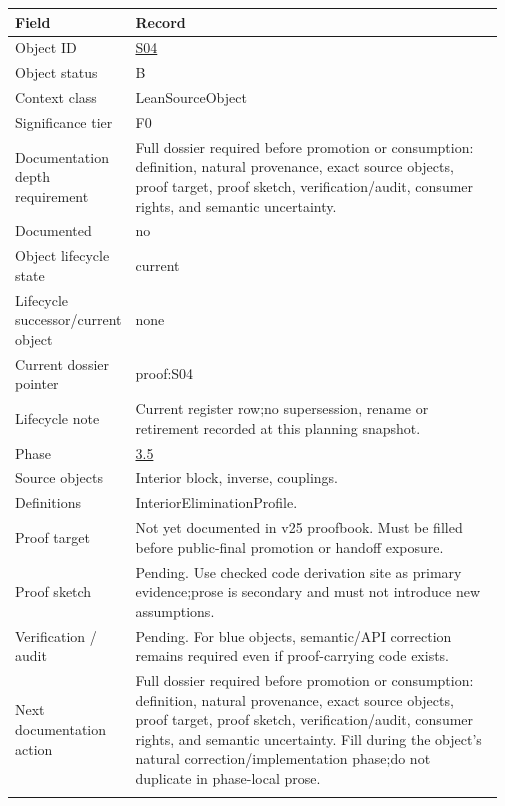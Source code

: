 \begin{longtable}{L{0.16\linewidth} L{0.81\linewidth}}
\hline
\textbf{Field} & \textbf{Record}\\
\hline
Object ID & \hyperlink{object-row-S04}{S04}\\
\hline\addlinespace[0.20em]
Object status & B\\
\hline\addlinespace[0.20em]
Context class & LeanSourceObject\\
\hline\addlinespace[0.20em]
Significance tier & F0\\
\hline\addlinespace[0.20em]
Documentation depth requirement & Full dossier required before promotion or consumption: definition, natural provenance, exact source objects, proof target, proof sketch, verification/\allowbreak{}audit, consumer rights, and semantic uncertainty.\\
\hline\addlinespace[0.20em]
Documented & no\\
\hline\addlinespace[0.20em]
Object lifecycle state & current\\
\hline\addlinespace[0.20em]
Lifecycle successor/\allowbreak{}current object & none\\
\hline\addlinespace[0.20em]
Current dossier pointer & proof:S04\\
\hline\addlinespace[0.20em]
Lifecycle note & Current register row;\newline no supersession, rename or retirement recorded at this planning snapshot.\\
\hline\addlinespace[0.20em]
Phase & \hyperlink{phase-row-3-5}{3.5}\\
\hline\addlinespace[0.20em]
Source objects & Interior block, inverse, couplings.\\
\hline\addlinespace[0.20em]
Definitions & InteriorEliminationProfile.\\
\hline\addlinespace[0.20em]
Proof target & Not yet documented in v25 proofbook. Must be filled before public-final promotion or handoff exposure.\\
\hline\addlinespace[0.20em]
Proof sketch & Pending. Use checked code derivation site as primary evidence;\newline prose is secondary and must not introduce new assumptions.\\
\hline\addlinespace[0.20em]
Verification /\allowbreak{} audit & Pending. For blue objects, semantic/\allowbreak{}API correction remains required even if proof-carrying code exists.\\
\hline\addlinespace[0.20em]
Next documentation action & Full dossier required before promotion or consumption: definition, natural provenance, exact source objects, proof target, proof sketch, verification/\allowbreak{}audit, consumer rights, and semantic uncertainty. Fill during the object's natural correction/\allowbreak{}implementation phase;\newline do not duplicate in phase-local prose.\\
\hline\addlinespace[0.20em]
\end{longtable}
